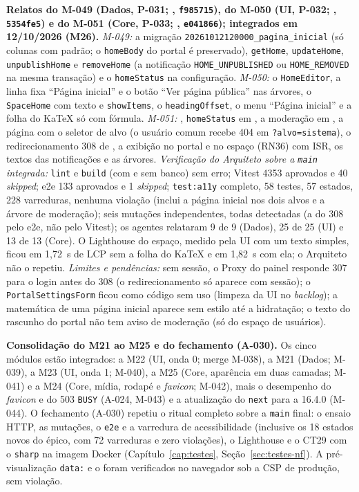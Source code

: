 \noindent{}\quad \textbf{Relatos do M-049 (Dados, P-031; , \texttt{f985715}), do M-050 (UI, P-032; , \texttt{5354fe5}) e do M-051 (Core, P-033; , \texttt{e041866}); integrados em 12/10/2026 (M26).} \emph{M-049:} a migração \texttt{20261012120000\_pagina\_inicial} (só colunas com padrão; o \texttt{homeBody} do portal é preservado), \texttt{getHome}, \texttt{updateHome}, \texttt{unpublishHome} e \texttt{removeHome} (a notificação \texttt{HOME\_UNPUBLISHED} ou \texttt{HOME\_REMOVED} na mesma transação) e o \texttt{homeStatus} na configuração. \emph{M-050:} o \texttt{HomeEditor}, a linha fixa ``Página inicial'' e o botão ``Ver página pública'' nas árvores, o \texttt{SpaceHome} com texto e \texttt{showItems}, o \texttt{headingOffset}, o menu ``Página inicial'' e a folha do KaTeX só com fórmula. \emph{M-051:} , \texttt{homeStatus} em , a moderação em , a página  com o seletor de alvo (o usuário comum recebe 404 em \texttt{?alvo=sistema}), o redirecionamento 308 de , a exibição no portal e no espaço (RN36) com ISR, os textos das notificações e as árvores. \emph{Verificação do Arquiteto sobre a \texttt{main} integrada:} \texttt{lint} e \texttt{build} (com e sem banco) sem erro; Vitest 4353 aprovados e 40 \emph{skipped}; e2e 133 aprovados e 1 \emph{skipped}; \texttt{test:a11y} completo, 58 testes, 57 estados, 228 varreduras, nenhuma violação (inclui a página inicial nos dois alvos e a árvore de moderação); seis mutações independentes, todas detectadas (a do 308 pelo e2e, não pelo Vitest); os agentes relataram 9 de 9 (Dados), 25 de 25 (UI) e 13 de 13 (Core). O Lighthouse do espaço, medido pela UI com um texto simples, ficou em 1,72~s de LCP sem a folha do KaTeX e em 1,82~s com ela; o Arquiteto não o repetiu. \emph{Limites e pendências:} sem sessão, o Proxy do painel responde 307 para o login antes do 308 (o redirecionamento só aparece com sessão); o \texttt{PortalSettingsForm} ficou como código sem uso (limpeza da UI no \emph{backlog}); a matemática de uma página inicial aparece sem estilo até a hidratação; o texto do rascunho do portal não tem aviso de moderação (só do espaço de usuários).

\textbf{Consolidação do M21 ao M25 e do fechamento (A-030).} Os cinco módulos estão integrados: a M22 (UI, onda 0; merge M-038), a M21 (Dados; M-039), a M23 (UI, onda 1; M-040), a M25 (Core, aparência em duas camadas; M-041) e a M24 (Core, mídia, rodapé e \emph{favicon}; M-042), mais o desempenho do \emph{favicon} e do 503 \texttt{BUSY} (A-024, M-043) e a atualização do \texttt{next} para a 16.4.0 (M-044). O fechamento (A-030) repetiu o ritual completo sobre a \texttt{main} final: o ensaio HTTP, as mutações, o \texttt{e2e} e a varredura de acessibilidade (inclusive os 18 estados novos do épico, com 72 varreduras e zero violações), o Lighthouse e o CT29 com o \texttt{sharp} na imagem Docker (Capítulo~\ref{cap:testes}, Seção~\ref{sec:testes-nf}). A pré-visualização \texttt{data:} e o  foram verificados no navegador sob a CSP de produção, sem violação.

